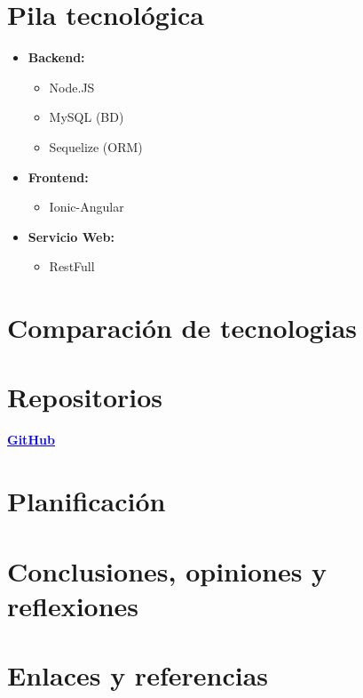 \documentclass{article}
\begin{document}
\section{Pila tecnológica}
\begin{itemize}
\item \textbf{Backend:}
\begin{itemize}
\item Node.JS
\item MySQL (BD)
\item Sequelize (ORM)
\end{itemize}
\item \textbf{Frontend:}
    \begin{itemize}
    \item Ionic-Angular
    \end{itemize}
    \item \textbf{Servicio Web:}
    \begin{itemize}
    \item RestFull
    \end{itemize}
\end{itemize}
\section{Comparación de tecnologias}
\section{Repositorios}
\begin{center}
    \href{https://github.com/Nestorbd/Full-Stack-Proyect}{\textbf{\textcolor{blue}{\underline{GitHub}}}}
\end{center}
\section{Planificación}
\section{Conclusiones, opiniones y reflexiones}
\section{Enlaces y referencias}
\end{document}
